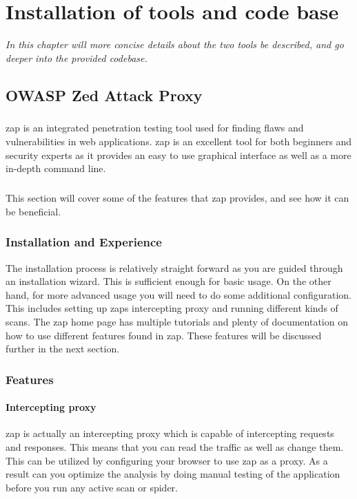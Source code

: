\documentclass[11pt,english,a4paper]{report}
\begin{document}
\chapter{Installation of tools and code base}
\label{cha:part2}
\textit{In this chapter will more concise details about the two tools be described, and go deeper into the provided codebase.}

\section{OWASP Zed Attack Proxy}
\paragraph{}
\gls{zap} is an integrated penetration testing tool used for finding flaws and vulnerabilities in web applications. 
\gls{zap} is an excellent tool for both beginners and security experts as it provides an easy to use graphical interface as well as a more in-depth command line.

\paragraph{}
This section will cover some of the features that \gls{zap} provides, and see how it can be beneficial.

\subsection{Installation and Experience}
The installation process is relatively straight forward as you are guided through an installation wizard. 
This is sufficient enough for basic usage. 
On the other hand, for more advanced usage you will need to do some additional configuration. 
This includes setting up \glspl{zap} intercepting proxy and running different kinds of scans. 
The \gls{zap} home page has multiple tutorials and plenty of documentation on how to use different features found in \gls{zap}. 
These features will be discussed further in the next section.

\subsection{Features}
\subsubsection{Intercepting proxy}
\gls{zap} is actually an intercepting proxy which is capable of intercepting requests and responses.
This means that you can read the traffic as well as change them.
This can be utilized by configuring your browser to use \gls{zap} as a proxy.
As a result can you optimize the analysis by doing manual testing of the application before you run any active scan or spider.
\end{document}
